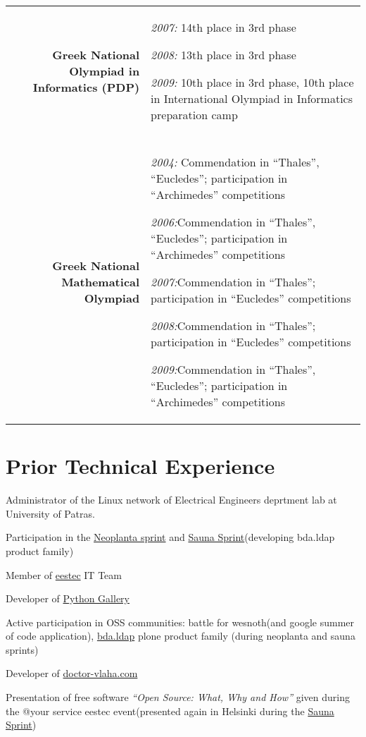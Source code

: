 \documentclass[letterpaper]{article}
\renewenvironment{itemize}{
  \begin{list}{}{
      \setlength{\leftmargin}{1.5em}
    }
  }{
  \end{list}
}
\begin{document}
\begin{tabularx}{\textwidth}{rX}
  {\bf Greek National Olympiad in Informatics (PDP)} &
  {\it 2007:} 14th place in 3rd phase \par
  {\it 2008:} 13th place in 3rd phase \par
  {\it 2009:} 10th place in 3rd phase, 10th place in International Olympiad
  in Informatics preparation camp \\
  \\
  {\bf Greek National Mathematical Olympiad} &
  {\it 2004:} Commendation in ``Thales'', ``Eucledes''; participation
  in ``Archimedes'' competitions \par
  {\it 2006:}Commendation in ``Thales'', ``Eucledes''; participation
  in ``Archimedes'' competitions \par
  {\it 2007:}Commendation in ``Thales''; participation
  in ``Eucledes'' competitions \par
  {\it 2008:}Commendation in ``Thales''; participation
  in ``Eucledes'' competitions \par
  {\it 2009:}Commendation in ``Thales'', ``Eucledes''; participation
  in ``Archimedes'' competitions\\
\end{tabularx}

\section*{Prior Technical Experience}

\begin{itemize}

\item Administrator of the Linux network of Electrical Engineers
  deprtment lab at University of Patras.

\item Participation in the \href{http://www.coactivate.org/projects/neoplanta-sprint/project-home}{Neoplanta sprint} and
  \href{http://plone.org/events/community/sauna-sprint-2010/}{Sauna Sprint}(developing bda.ldap product family)

\item Member of \href{http://eestec.net}{eestec} IT Team

\item Developer of
  \href{http://code.google.com/p/pythongallery/}{Python Gallery}

\item Active participation in OSS communities: battle for wesnoth(and
  google summer of code application), \href{http://pypi.python.org/pypi/bda.ldap/}{bda.ldap} plone product family
  (during neoplanta and sauna sprints)

\item Developer of \href{http://doctor-vlaha.com}{doctor-vlaha.com}

\item Presentation of free software {\it ``Open Source: What, Why and
    How''} given during the @your service eestec event(presented again
  in Helsinki during the \href{http://eestec.net/news-and-offers/plone-sauna-sprint-mid-term-report}{Sauna Sprint})

\end{itemize}
\end{document}
